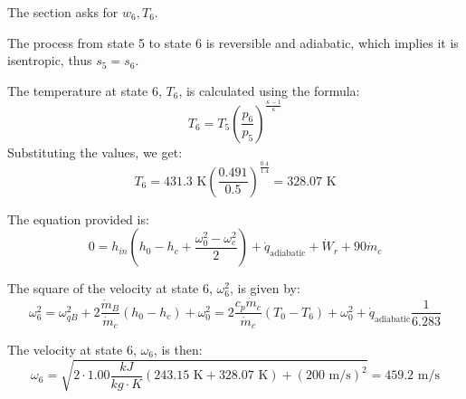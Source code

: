 The section asks for \( w_6, T_6 \).

The process from state 5 to state 6 is reversible and adiabatic, which implies it is isentropic, thus \( s_5 = s_6 \).

The temperature at state 6, \( T_6 \), is calculated using the formula:
\[ T_6 = T_5 \left( \frac{p_6}{p_5} \right)^{\frac{\kappa - 1}{\kappa}} \]
Substituting the values, we get:
\[ T_6 = 431.3 \text{ K} \left( \frac{0.491}{0.5} \right)^{\frac{0.4}{1.4}} = 328.07 \text{ K} \]

The equation provided is:
\[ 0 = h_{in} \left( h_0 - h_c + \frac{\omega_0^2 - \omega_c^2}{2} \right) + \dot{q}_{\text{adiabatic}} + \dot{W}_r + 90 \dot{m}_c \]

The square of the velocity at state 6, \( \omega_6^2 \), is given by:
\[ \omega_6^2 = \omega_{qB}^2 + 2 \frac{\dot{m}_B}{\dot{m}_c} (h_0 - h_c) + \omega_0^2 = 2 \frac{c_p \dot{m}_c}{\dot{m}_c} (T_0 - T_6) + \omega_0^2 + \dot{q}_{\text{adiabatic}} \frac{1}{6.283} \]

The velocity at state 6, \( \omega_6 \), is then:
\[ \omega_6 = \sqrt{2 \cdot 1.00 \frac{kJ}{kg \cdot K} (243.15 \text{ K} + 328.07 \text{ K}) + (200 \text{ m/s})^2} = 459.2 \text{ m/s} \]